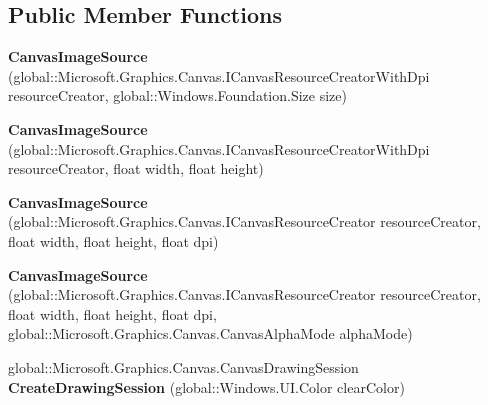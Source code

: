 \subsection*{Public Member Functions}
\begin{DoxyCompactItemize}
\item 
\mbox{\label{class_microsoft_1_1_graphics_1_1_canvas_1_1_u_i_1_1_xaml_1_1_canvas_image_source_a9eb6e499e761bca49e7066fd004cac4a}} 
{\bfseries Canvas\+Image\+Source} (global\+::\+Microsoft.\+Graphics.\+Canvas.\+I\+Canvas\+Resource\+Creator\+With\+Dpi resource\+Creator, global\+::\+Windows.\+Foundation.\+Size size)
\item 
\mbox{\label{class_microsoft_1_1_graphics_1_1_canvas_1_1_u_i_1_1_xaml_1_1_canvas_image_source_a59470b76c2a432e8d723603569f5e5bf}} 
{\bfseries Canvas\+Image\+Source} (global\+::\+Microsoft.\+Graphics.\+Canvas.\+I\+Canvas\+Resource\+Creator\+With\+Dpi resource\+Creator, float width, float height)
\item 
\mbox{\label{class_microsoft_1_1_graphics_1_1_canvas_1_1_u_i_1_1_xaml_1_1_canvas_image_source_a879541668a8b03ad33dddb352363a22b}} 
{\bfseries Canvas\+Image\+Source} (global\+::\+Microsoft.\+Graphics.\+Canvas.\+I\+Canvas\+Resource\+Creator resource\+Creator, float width, float height, float dpi)
\item 
\mbox{\label{class_microsoft_1_1_graphics_1_1_canvas_1_1_u_i_1_1_xaml_1_1_canvas_image_source_af7653cd38e9fa993c395e9aab7f32134}} 
{\bfseries Canvas\+Image\+Source} (global\+::\+Microsoft.\+Graphics.\+Canvas.\+I\+Canvas\+Resource\+Creator resource\+Creator, float width, float height, float dpi, global\+::\+Microsoft.\+Graphics.\+Canvas.\+Canvas\+Alpha\+Mode alpha\+Mode)
\item 
\mbox{\label{class_microsoft_1_1_graphics_1_1_canvas_1_1_u_i_1_1_xaml_1_1_canvas_image_source_a4252f5557def050fbeabcb6a457d4ec6}} 
global\+::\+Microsoft.\+Graphics.\+Canvas.\+Canvas\+Drawing\+Session {\bfseries Create\+Drawing\+Session} (global\+::\+Windows.\+U\+I.\+Color clear\+Color)

\end{DoxyCompactItemize}
